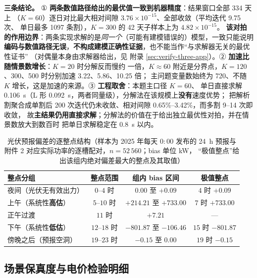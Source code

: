 \textbf{三条结论。} ① \textbf{两条数值路径给出的最优值一致到机器精度}：结果窗口全部 334 天上
（$K=60$）逐日对比最大相对间隙 $3.76\times10^{-15}$、全部收敛（平均迭代 9.75 次、
单日最多 1097 条割），$K=300$ 的 42 天子样本上为 $4.82\times10^{-15}$。
\textbf{该对拍的作用边界}：两条实现求解的是\emph{同一个}（可能有建模错误的）模型，一致只能说明
\textbf{编码与数值路径无误}，\textbf{不构成建模正确性证据}，也不能当作“与求解器无关的最优性证书”
（对偶量本身由求解器给出，见 附录 \ref{sec:verify-three-app}）。② \textbf{加速比随情景数增长}：$K=20$ 时分解反而慢约
一倍，$K\approx60$ 附近是分界点，$K=120$、300、500 时分别加速 3.22、5.86、10.25 倍；
主问题变量数始终为 720、不随 $K$ 增长，这是加速的来源。③ \textbf{工程取舍}：本题主口径 $K=60$、
单日直接求解 0.106~s（L 形 0.092~s，两者同量级），分解法在该规模上\textbf{没有}速度优势；
把解析割聚合成单割后 200 次迭代仍未收敛、相对间隙 0.65\%--3.42\%，而多割 9--14 次即收敛，
故\textbf{主结果仍用直接求解}；分解法的价值在于给出独立最优性对拍，并在情景数放大到数百时
把单日求解稳定在 0.8~s 以内。







\begin{table}[htbp]
  \centering
  \caption{光伏预报偏差的逐整点结构（样本为 2025 年每天 \(0{:}00\) 发布的 24~h 预报与
           附件 2 对应实际功率的逐槽配对，\(n=52\,560\)；bias 单位 kW，
           “极值整点”给出该组内绝对偏差最大的整点及其取值）}
  \label{tab:biasprofile}
  \footnotesize
  \setlength{\tabcolsep}{4pt}
  \begin{tabular}{lccc}
    \toprule
    整点分组 & 整点范围 & 组内 bias 区间 & 极值整点 \\
    \midrule
    夜间（光伏无有效出力） & \(0\)--\(4\) 时 & \(0.00\) 至 \(+0.09\) & \(4\) 时 \(+0.09\) \\
    上午（系统性\textbf{高估}） & \(5\)--\(10\) 时 & \(+214.21\) 至 \(+733.00\) & \(7\) 时 \(+733.00\) \\
    正午过渡 & \(11\) 时 & \(+7.21\) & --- \\
    下午（系统性\textbf{低估}） & \(12\)--\(18\) 时 & \(-801.87\) 至 \(-106.46\) & \(15\) 时 \(-801.87\) \\
    傍晚之后（预报空洞） & \(19\)--\(23\) 时 & \(-0.15\) 至 \(0.00\) & \(19\) 时 \(-0.15\) \\
    \bottomrule
  \end{tabular}
\end{table}

\subsection{场景保真度与电价检验明细}


